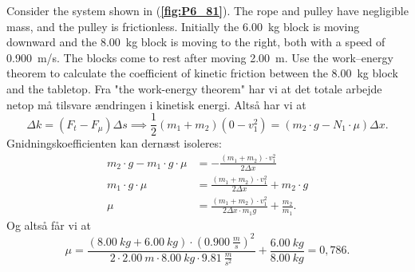 \documentclass[12pt]{article}
\begin{document}
Consider the system shown in (\textbf{\autoref{fig:P6_81}}). The rope and pulley have negligible mass, and the pulley is frictionless. Initially the \qty{6,00}{kg} block is moving downward and the \qty{8,00}{kg} block is moving to the right, both with a speed of \qty{0,900}{m/s}. The blocks come to rest after moving \qty{2,00}{m}. Use the work–energy theorem to calculate the coefficient of kinetic friction between the \qty{8,00}{kg} block and the tabletop.
\bigbreak
Fra "the work-energy theorem" har vi at det totale arbejde netop må tilsvare ændringen i kinetisk energi. Altså har vi at
\[
\Delta k = \left( F_t - F_\mu \right) \Delta s \implies \frac{1}{2} (m_1+m_2) \left( 0 - v_1^2 \right)  = \left( m_2 \cdot g - N_1 \cdot \mu \right)\Delta x  
.\]
Gnidningskoefficienten kan dernæst isoleres:
\begin{align*}
  m_2\cdot g - m_1\cdot g\cdot \mu &= - \frac{(m_1 + m_2)\cdot v_1^2}{2\Delta x} \\
  m_1\cdot g\cdot \mu &= \frac{(m_1 + m_2)\cdot v_1^2}{2\Delta x} + m_2\cdot g \\
  \mu &= \frac{(m_1 + m_2) \cdot v_1^2}{2\Delta x \cdot m_1 g} + \frac{m_2}{m_1}
.\end{align*}
Og altså får vi at
\[
  \mu = \frac{\left( \qty{8,00}{kg} + \qty{6,00}{kg} \right) \cdot \left(\qty{0,900}{\frac{m}{s}}\right)^2}{2\cdot \qty{2,00}{m}\cdot \qty{8,00}{kg}\cdot \qty{9,81}{\frac{m}{s^2}}} + \frac{\qty{6,00}{kg}}{\qty{8,00}{kg}} =  0,786
.\]
\end{document}
